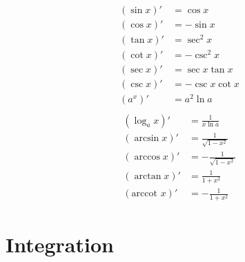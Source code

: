 \begin{multicols}{2}
\begin{equation*}
    \begin{aligned}
        (\sin x)' &= \cos x \\
        (\cos x)' &= - \sin x \\
        (\tan x)' &= \sec^2 x\\
        (\cot x)' &= - \csc^2 x \\
        (\sec x)' &= \sec x \tan x \\
        (\csc x)' &= -\csc x \cot x \\
        (a^x)' &= a^2 \ln a \\
    \end{aligned}
\end{equation*}
\begin{equation*}
    \begin{aligned}
        (\log_a x)' &= \frac{1}{x \ln a} \\
        (\arcsin x)' &= \frac{1}{\sqrt{1-x^2}} \\
        (\arccos x)' &= -\frac{1}{\sqrt{1-x^2}} \\
        (\arctan x)' &= \frac{1}{1+x^2} \\
        (\text{arccot } x)' &= -\frac{1}{1+x^2}
    \end{aligned}
\end{equation*}
\end{multicols}






\section{Integration}

